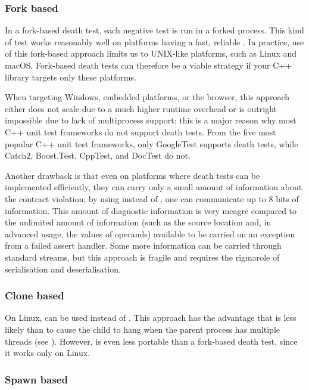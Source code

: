 \subsubsection{Fork based}

In a fork-based death test, each negative test is run in a forked process. This kind of test works reasonably well on platforms having a fast, reliable . In practice, use of this fork-based approach limits us to UNIX-like platforms, such as Linux and macOS. Fork-based death tests can therefore be a viable strategy if your C++ library targets only these platforms.

When targeting Windows, embedded platforms, or the browser, this approach either does not scale due to a much higher runtime overhead or is outright impossible due to lack of multiprocess support: this is a major reason why most C++ unit test frameworks do not support death tests. From the five most popular C++ unit test frameworks, only GoogleTest supports death tests, while Catch2, Boost.Test, CppTest, and DocTest do not.

Another drawback is that even on platforms where death tests can be implemented efficiently, they can carry only a small amount of information about the contract violation; by using  instead of , one can communicate up to 8 bits of information. This amount of diagnostic information is very meagre compared to the unlimited amount of information (such as the source location and, in advanced usage, the values of operands) available to be carried on an exception from a failed assert handler. Some more information can be carried through standard streams, but this approach is fragile and requires the rigmarole of serialisation and deserialisation.

\subsubsection{Clone based}

On Linux,  can be used instead of . This approach has the advantage that  is less likely than  to cause the child to hang when the parent process has multiple threads (see \cite{GTestDocDeathTests}). However,  is even less portable than a fork-based death test, since it works only on Linux.

\subsubsection{Spawn based}

